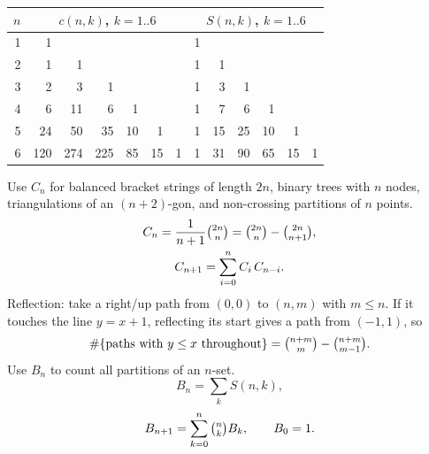 {\begin{tabular}{@{}r|rrrrrr|rrrrrr@{}}
\toprule
$n$ & \multicolumn{6}{c|}{$c(n, k)$, $k = 1..6$} & \multicolumn{6}{c}{$S(n, k)$, $k = 1..6$} \\
\midrule
1 & 1 &  &  &  &  &  & 1 &  &  &  &  &  \\
2 & 1 & 1 &  &  &  &  & 1 & 1 &  &  &  &  \\
3 & 2 & 3 & 1 &  &  &  & 1 & 3 & 1 &  &  &  \\
4 & 6 & 11 & 6 & 1 &  &  & 1 & 7 & 6 & 1 &  &  \\
5 & 24 & 50 & 35 & 10 & 1 &  & 1 & 15 & 25 & 10 & 1 &  \\
6 & 120 & 274 & 225 & 85 & 15 & 1 & 1 & 31 & 90 & 65 & 15 & 1 \\
\bottomrule
\end{tabular}
Use $C_n$ for balanced bracket strings of length $2n$, binary trees with $n$ nodes, triangulations of an $(n+2)$-gon, and non-crossing partitions of $n$ points.
\begin{gather*} C_n = \frac{1}{n+1}\tbinom{2n}{n} = \tbinom{2n}{n} - \tbinom{2n}{n+1}, \\ C_{n+1} = \sum_{i=0}^{n} C_i\, C_{n-i}. \end{gather*}
Reflection: take a right/up path from $(0, 0)$ to $(n, m)$ with $m \le n$.
If it touches the line $y = x + 1$, reflecting its start gives a path from $(-1, 1)$, so
\[ \#\{\text{paths with } y \le x \text{ throughout}\} = \tbinom{n+m}{m} - \tbinom{n+m}{m-1}. \]
Use $B_n$ to count all partitions of an $n$-set.
\[ B_n = \sum_k S(n, k), \]
\[ B_{n+1} = \sum_{k=0}^{n} \tbinom{n}{k} B_k, \qquad B_0 = 1. \]

}
